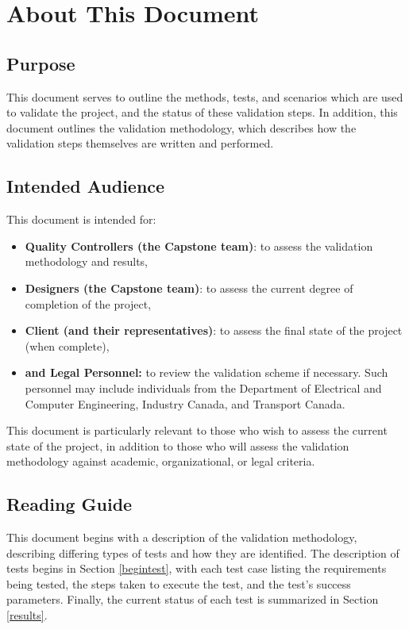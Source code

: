 \documentclass[10pt,letterpaper]{article}
\begin{document}




\section{About This Document}

\subsection{Purpose}
This document serves to outline the methods, tests, and scenarios which are used to validate the project, and the status of these validation steps. In addition, this document outlines the validation methodology, which describes how the validation steps themselves are written and performed.

\subsection{Intended Audience}
This document is intended for:
\begin{itemize}
\item \textbf{Quality Controllers (the Capstone team)}: to assess the validation methodology and results,
\item \textbf{Designers (the Capstone team)}: to assess the current degree of completion of the project,
\item \textbf{Client (and their representatives)}: to assess the final state of the project (when complete),
\item \textbf{and Legal Personnel:} to review the validation scheme if necessary. Such personnel may include individuals from the Department of Electrical and Computer Engineering, Industry Canada, and Transport Canada.
\end{itemize}

This document is particularly relevant to those who wish to assess the current state of the project, in addition to those who will assess the validation methodology against academic, organizational, or legal criteria.

\subsection{Reading Guide}
This document begins with a description of the validation methodology, describing differing types of tests and how they are identified. The description of tests begins in Section \ref{begintest}, with each test case listing the requirements being tested, the steps taken to execute the test, and the test's success parameters. Finally, the current status of each test is summarized in Section \ref{results}.
\end{document}
